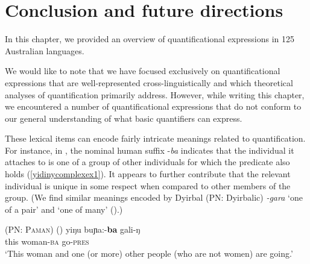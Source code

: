 \documentclass[12pt,egregdoesnotlikesansseriftitles]{scrartcl}
\begin{document}




\section{Conclusion and future directions}

In this chapter, we provided an overview of quantificational expressions in 125 Australian languages.

We would like to note that we have focused exclusively on quantificational expressions that are well-represented cross-linguistically and which theoretical analyses of quantification primarily address. However, while writing this chapter, we encountered a number of quantificational expressions that do not conform to our general understanding of what basic quantifiers can express. 

These lexical items can encode fairly intricate meanings related to quantification. For instance, in  , the nominal human suffix -\textit{ba} indicates that the individual it attaches to is one of a group of other individuals for which the predicate also holds (\ref{yidinycomplexex1}). It appears to further contribute that the relevant individual is unique in some respect when compared to other members of the group. (We find similar meanings encoded by Dyirbal (PN: Dyirbalic)  \textit{-gara} `one of a pair' and {} `one of many' (\citealt[230--231]{dixon72}).)


\begin{exe}
\ex \textsc{ (PN: Paman)} \hfill (\citealt[146]{dixon77}) \label{yidinycomplexex1}
\vspace{-2mm}
\gll yiŋu buɲa:-\textbf{ba}          gali-ŋ \\
  this woman-\textsc{ba}   go-\textsc{pres} \\
  \vspace{-2mm}
`This woman and one (or more) other people (who are not women) are     going.'
\end{exe}
\end{document}
